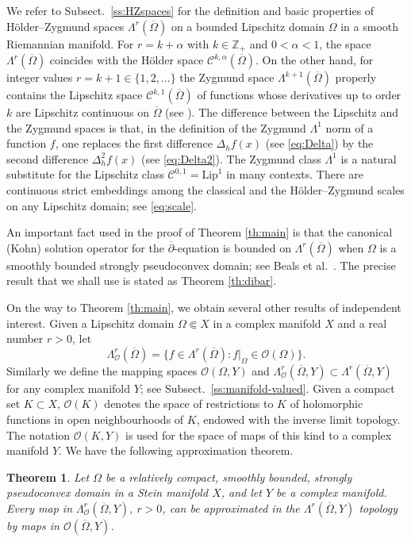 \documentclass[11pt]{amsart}
\numberwithin{equation}{section}
\newtheorem{theorem}{Theorem}[section]
\theoremstyle{definition}
\newcommand\Cscr{\mathscr{C}}
\newcommand\Oscr{\mathscr{O}}
\newcommand\Z{\mathbb{Z}}
\newcommand\dibar{\overline\partial}
\newcommand\Lip{\mathrm{Lip}}
\begin{document}
We refer to Subsect.\ \ref{ss:HZspaces} for the definition
and basic properties of H\"older--Zygmund spaces
$\Lambda^r(\overline \Omega)$ on a bounded Lipschitz domain
$\Omega$ in a smooth Riemannian manifold. 
For $r=k+\alpha$ with $k\in\Z_+$ and $0<\alpha<1$, 
the space $\Lambda^r(\overline \Omega)$ coincides with the  
H\"older space $\Cscr^{k,\alpha}(\overline \Omega)$. On the other hand,
for integer values $r=k+1\in \{1,2,\ldots\}$ the Zygmund space
$\Lambda^{k+1}(\overline \Omega)$ properly contains 
the Lipschitz space $\Cscr^{k,1}(\overline \Omega)$ 
of functions whose derivatives up to order $k$ 
are Lipschitz continuous on $\overline \Omega$
(see \cite[Example 4.3.1, p.\ 148]{SteinEM1970}). 
The difference between the Lipschitz and the Zygmund
spaces is that, in the definition of the Zygmund 
$\Lambda^1$ norm of a function $f$, one replaces the first 
difference $\Delta_h f(x)$ (see \eqref{eq:Delta})
by the second difference $\Delta^2_h f(x)$ (see \eqref{eq:Delta2}).
The Zygmund class $\Lambda^{1}$
is a natural substitute for the Lipschitz class $\Cscr^{0,1}=\Lip^1$ 
in many contexts. There are continuous strict embeddings among the 
classical and the H\"older--Zygmund scales on any Lipschitz domain;
see \eqref{eq:scale}. 

An important fact used in the proof of Theorem \ref{th:main} is that the 
canonical (Kohn) solution operator for the $\dibar$-equation
is bounded on $\Lambda^r(\overline \Omega)$
when $\Omega$ is a smoothly bounded strongly pseudoconvex 
domain; see Beals et al.\ \cite{BealsGreinerStanton1987}.
The precise result that we shall use is stated as Theorem \ref{th:dibar}.

On the way to Theorem \ref{th:main}, 
we obtain several other results of independent interest.
Given a Lipschitz domain $\Omega\Subset X$ in a complex manifold $X$
and a real number $r>0$, let
\[
	\Lambda^r_\Oscr(\overline \Omega) = 
	\{f\in \Lambda^r(\overline \Omega): f|_\Omega\in \Oscr(\Omega)\}.
\] 
Similarly we define the mapping spaces $\Oscr(\Omega,Y)$ and 
$\Lambda^r_\Oscr(\overline \Omega,Y) \subset 
\Lambda^r(\overline \Omega,Y)$ for any complex manifold $Y$;
see Subsect.\ \ref{ss:manifold-valued}.  
Given a compact set $K\subset X$, 
$\Oscr(K)$ denotes the space of restrictions to $K$ 
of holomorphic functions in open neighbourhoods of $K$, endowed
with the inverse limit topology. The notation
$\Oscr(K,Y)$ is used for the space of maps of this kind
to a complex manifold $Y$. We have the following approximation theorem. 

%
%
\begin{theorem}\label{th:approximation}
Let $\Omega$ be a relatively compact, smoothly bounded, strongly 
pseudoconvex domain in a Stein manifold $X$, and let 
$Y$ be a complex manifold. Every map 
in $\Lambda^r_\Oscr(\overline \Omega,Y)$, $r>0$, 
can be approximated in the $\Lambda^r(\overline \Omega,Y)$ 
topology by maps in $\Oscr(\overline\Omega,Y)$. 
\end{theorem}
\end{document}
